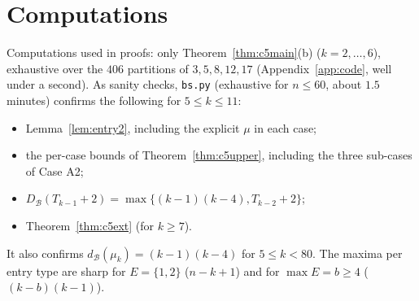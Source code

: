 \documentclass[11pt]{article}
\theoremstyle{definition}
\newcommand{\dB}{d_{\mathcal{B}}}
\newcommand{\DB}{D_{\mathcal{B}}}
\renewcommand{\le}{\leqslant}
\renewcommand{\ge}{\geqslant}
\begin{document}
\section{Computations}
Computations used in proofs: only Theorem~\ref{thm:c5main}(b) ($k=2,\dots,6$), exhaustive over the $406$ partitions of
$3,5,8,12,17$ (Appendix~\ref{app:code}, well under a second).  As sanity checks, \texttt{bs.py} (exhaustive for $n\le60$,
about $1.5$ minutes) confirms the following for $5\le k\le11$:
\begin{itemize}
\item Lemma~\ref{lem:entry2}, including the explicit $\mu$ in each case;
\item the per-case bounds of Theorem~\ref{thm:c5upper}, including the three sub-cases of Case A2;
\item $\DB(T_{k-1}+2)=\max\{(k-1)(k-4),T_{k-2}+2\}$;
\item Theorem~\ref{thm:c5ext} (for $k\ge7$).
\end{itemize}
It also confirms $\dB(\mu_k)=(k-1)(k-4)$ for $5\le k<80$.  The maxima per entry type are sharp for $E=\{1,2\}$
($n-k+1$) and for $\max E=b\ge4$ ($(k-b)(k-1)$).

\appendix
\end{document}
